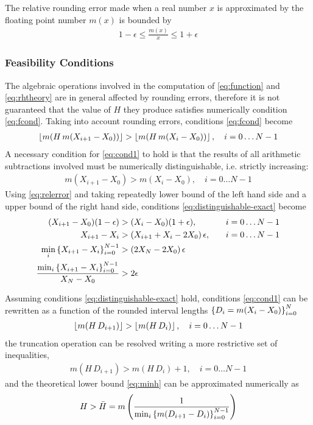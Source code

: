 \documentclass[preprint,1p,times]{elsarticle}
\begin{document}
The relative rounding error made when a real number $x$ is approximated by the floating point number $m(x)$ is bounded by
\begin{align}
\label{eq:relerror}
1-\epsilon \leq \frac{m(x)}{x} \leq 1+\epsilon
\end{align}

\subsubsection{Feasibility Conditions}
The algebraic operations involved in the computation of \eqref{eq:function} and \eqref{eq:rhtheory} are in general affected by rounding errors, therefore it is not guaranteed that the value of $H$ they produce satisfies numerically condition \eqref{eq:fcond}.
Taking into account rounding errors, conditions \eqref{eq:fcond} become
\begin{align}
\label{eq:cond1}
	 \left \lfloor  m(H\, m(X_{i+1}-X_0))  \right \rfloor >  \left \lfloor  m(H\, m(X_{i}-X_0))  \right \rfloor, \quad i=0\dots N-1
\end{align}
A necessary condition for \eqref{eq:cond1} to hold is that the results of all arithmetic subtractions involved must be numerically distinguishable, i.e. strictly increasing:
\begin{align}
\label{eq:distinguishable-exact}
	m(X_{i+1}-X_0) > m(X_{i}-X_0),   \quad i=0\dots N-1
\end{align}
Using \eqref{eq:relerror} and taking repeatedly lower bound of the left hand side and a upper bound of the right hand side, conditions \eqref{eq:distinguishable-exact} become
\begin{align}
	 (X_{i+1}-X_0)(1-\epsilon) &> (X_{i}-X_0)(1+\epsilon) ,   &&\quad i=0\dots N-1 \notag\\
	X_{i+1}-X_i &> (X_{i+1}+X_{i}-2X_0)\,\epsilon ,   &&\quad i=0\dots N-1 \notag \\
	\min_i\left \{ X_{i+1}-X_i \right \}_{i=0}^{N-1} &> (2X_N-2X_0)\,\epsilon  \notag \\
\label{eq:distinguishable-approx}
	 \dfrac{ \min_i\left \{ X_{i+1}-X_i \right \}_{i=0}^{N-1} }{X_{N}-X_0} &>2\epsilon
\end{align}

Assuming conditions \eqref{eq:distinguishable-exact} hold, conditions \eqref{eq:cond1} can be rewritten as a function of the rounded interval lengths $\left \{ D_i=m(X_i-X_0) \right \}_{i=0}^N$
\begin{align}
\label{eq:cond2}
	 \left \lfloor  m(H\, D_{i+1})  \right \rfloor >  \left \lfloor  m(H\, D_i)  \right \rfloor, \quad i=0\dots N-1
\end{align}
the truncation operation can be resolved writing a more restrictive set of inequalities, 
\begin{align}
\label{eq:cond3}
	 m(H\, D_{i+1}) >  m(H\, D_i) + 1, \quad i=0\dots N-1
\end{align}
and the theoretical lower bound \eqref{eq:minh} can be approximated numerically as 
\begin{align}
\label{eq:minhnumeric}
	H > \bar{H}
		= m\left(\frac{1}{\min_i\left \{ m(D_{i+1}-D_{i}) \right \}_{i=0}^{N-1}}\right)
\end{align}
\end{document}
